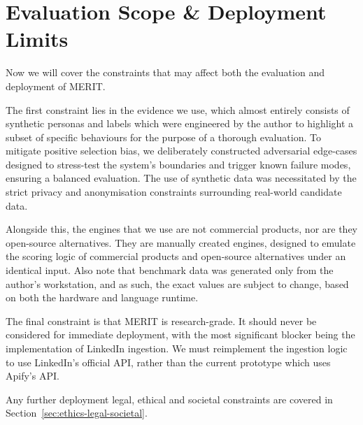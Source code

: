 \section{Evaluation Scope \& Deployment Limits}
\label{sec:scope-deployment}

Now we will cover the constraints that may affect both the evaluation and deployment of MERIT.

The first constraint lies in the evidence we use, which almost entirely consists of synthetic personas and labels which were engineered by the author
to highlight a subset of specific behaviours for the purpose of a thorough evaluation. To mitigate positive selection bias, we deliberately 
constructed adversarial edge-cases designed to stress-test the system's boundaries and trigger known failure modes, ensuring a balanced evaluation. 
The use of synthetic data was necessitated by the strict privacy and anonymisation constraints surrounding real-world candidate data.

Alongside this, the engines that we use are not commercial products, nor are they open-source alternatives. They are manually created engines,
designed to emulate the scoring logic of commercial products and open-source alternatives under an identical input. Also note that benchmark data
was generated only from the author's workstation, and as such, the exact values are subject to change, based on both the hardware and language runtime.

The final constraint is that MERIT is research-grade. It should never be considered for immediate deployment, with the most significant
blocker being the implementation of LinkedIn ingestion. We must reimplement the ingestion logic to use LinkedIn's official API, rather than the current
prototype which uses Apify's API.

Any further deployment legal, ethical and societal constraints are covered in Section~\ref{sec:ethics-legal-societal}.